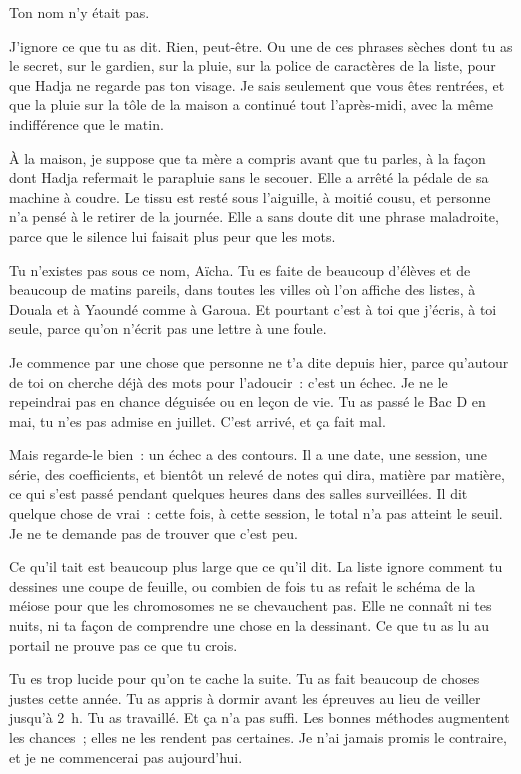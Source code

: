 \documentclass[10.5pt,twoside,openright]{book}
\begin{document}
Ton nom n’y était pas.

J’ignore ce que tu as dit. Rien, peut-être. Ou une de ces phrases sèches dont tu as le secret, sur le gardien, sur la pluie, sur la police de caractères de la liste, pour que Hadja ne regarde pas ton visage. Je sais seulement que vous êtes rentrées, et que la pluie sur la tôle de la maison a continué tout l’après-midi, avec la même indifférence que le matin.

À la maison, je suppose que ta mère a compris avant que tu parles, à la façon dont Hadja refermait le parapluie sans le secouer. Elle a arrêté la pédale de sa machine à coudre. Le tissu est resté sous l’aiguille, à moitié cousu, et personne n’a pensé à le retirer de la journée. Elle a sans doute dit une phrase maladroite, parce que le silence lui faisait plus peur que les mots.

Tu n’existes pas sous ce nom, Aïcha. Tu es faite de beaucoup d’élèves et de beaucoup de matins pareils, dans toutes les villes où l’on affiche des listes, à Douala et à Yaoundé comme à Garoua. Et pourtant c’est à toi que j’écris, à toi seule, parce qu’on n’écrit pas une lettre à une foule.

Je commence par une chose que personne ne t’a dite depuis hier, parce qu’autour de toi on cherche déjà des mots pour l’adoucir : c’est un échec. Je ne le repeindrai pas en chance déguisée ou en leçon de vie. Tu as passé le Bac D en mai, tu n’es pas admise en juillet. C’est arrivé, et ça fait mal.

Mais regarde-le bien : un échec a des contours. Il a une date, une session, une série, des coefficients, et bientôt un relevé de notes qui dira, matière par matière, ce qui s’est passé pendant quelques heures dans des salles surveillées. Il dit quelque chose de vrai : cette fois, à cette session, le total n’a pas atteint le seuil. Je ne te demande pas de trouver que c’est peu.

Ce qu’il tait est beaucoup plus large que ce qu’il dit. La liste ignore comment tu dessines une coupe de feuille, ou combien de fois tu as refait le schéma de la méiose pour que les chromosomes ne se chevauchent pas. Elle ne connaît ni tes nuits, ni ta façon de comprendre une chose en la dessinant. Ce que tu as lu au portail ne prouve pas ce que tu crois.

Tu es trop lucide pour qu’on te cache la suite. Tu as fait beaucoup de choses justes cette année. Tu as appris à dormir avant les épreuves au lieu de veiller jusqu’à 2 h. Tu as travaillé. Et ça n’a pas suffi. Les bonnes méthodes augmentent les chances ; elles ne les rendent pas certaines. Je n’ai jamais promis le contraire, et je ne commencerai pas aujourd’hui.
\end{document}
